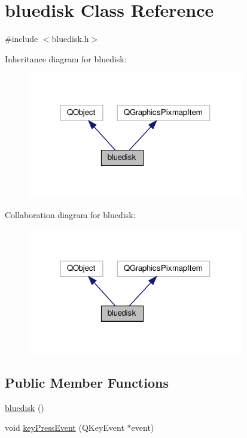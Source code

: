 \hypertarget{classbluedisk}{}\section{bluedisk Class Reference}
\label{classbluedisk}


{\ttfamily \#include $<$bluedisk.\+h$>$}



Inheritance diagram for bluedisk\+:
\nopagebreak
\begin{figure}[H]
\begin{center}
\leavevmode
\includegraphics[width=268pt]{classbluedisk__inherit__graph}
\end{center}
\end{figure}


Collaboration diagram for bluedisk\+:
\nopagebreak
\begin{figure}[H]
\begin{center}
\leavevmode
\includegraphics[width=268pt]{classbluedisk__coll__graph}
\end{center}
\end{figure}
\subsection*{Public Member Functions}
\begin{DoxyCompactItemize}
\item 
\hyperlink{classbluedisk_a4c25a42bc9ca6b380b918da7263be78a}{bluedisk} ()
\item 
void \hyperlink{classbluedisk_a813b7b37630ef6ae56feb3cf10519b7b}{key\+Press\+Event} (Q\+Key\+Event $\ast$event)
\end{DoxyCompactItemize}


